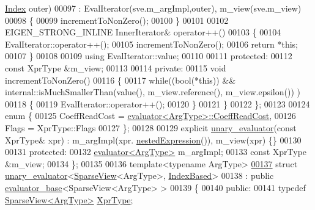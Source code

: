 \begin{DoxyCode}
      \hyperlink{namespace_eigen_a62e77e0933482dafde8fe197d9a2cfde}{Index} outer)
00097           : EvalIterator(sve.m\_argImpl,outer), m\_view(sve.m\_view)
00098         \{
00099           incrementToNonZero();
00100         \}
00101 
00102         EIGEN\_STRONG\_INLINE InnerIterator& operator++()
00103         \{
00104           EvalIterator::operator++();
00105           incrementToNonZero();
00106           \textcolor{keywordflow}{return} *\textcolor{keyword}{this};
00107         \}
00108 
00109         \textcolor{keyword}{using} EvalIterator::value;
00110 
00111       \textcolor{keyword}{protected}:
00112         \textcolor{keyword}{const} XprType &m\_view;
00113 
00114       \textcolor{keyword}{private}:
00115         \textcolor{keywordtype}{void} incrementToNonZero()
00116         \{
00117           \textcolor{keywordflow}{while}((\textcolor{keywordtype}{bool}(*\textcolor{keyword}{this})) && internal::isMuchSmallerThan(value(), m\_view.reference(), m\_view.epsilon())
      )
00118           \{
00119             EvalIterator::operator++();
00120           \}
00121         \}
00122     \};
00123     
00124     \textcolor{keyword}{enum} \{
00125       CoeffReadCost = \hyperlink{struct_eigen_1_1internal_1_1evaluator}{evaluator<ArgType>::CoeffReadCost},
00126       Flags = XprType::Flags
00127     \};
00128     
00129     \textcolor{keyword}{explicit} \hyperlink{struct_eigen_1_1internal_1_1unary__evaluator}{unary\_evaluator}(\textcolor{keyword}{const} XprType& xpr) : m\_argImpl(xpr.
      \hyperlink{group___sparse_core___module_a50f53a9405017012077ae907959aca14}{nestedExpression}()), m\_view(xpr) \{\}
00130 
00131   \textcolor{keyword}{protected}:
00132     \hyperlink{struct_eigen_1_1internal_1_1evaluator}{evaluator<ArgType>} m\_argImpl;
00133     \textcolor{keyword}{const} XprType &m\_view;
00134 \};
00135 
00136 \textcolor{keyword}{template}<\textcolor{keyword}{typename} ArgType>
\hyperlink{struct_eigen_1_1internal_1_1unary__evaluator_3_01_sparse_view_3_01_arg_type_01_4_00_01_index_based_01_4}{00137} \textcolor{keyword}{struct }\hyperlink{struct_eigen_1_1internal_1_1unary__evaluator}{unary\_evaluator}<\hyperlink{group___sparse_core___module_class_eigen_1_1_sparse_view}{SparseView}<ArgType>, \hyperlink{struct_eigen_1_1internal_1_1_index_based}{IndexBased}>
00138   : \textcolor{keyword}{public} \hyperlink{struct_eigen_1_1internal_1_1evaluator__base}{evaluator\_base}<SparseView<ArgType> >
00139 \{
00140   \textcolor{keyword}{public}:
00141     \textcolor{keyword}{typedef} \hyperlink{group___sparse_core___module_class_eigen_1_1_sparse_view}{SparseView<ArgType>} \hyperlink{group___sparse_core___module_class_eigen_1_1_sparse_view}{XprType};

\end{DoxyCode}
